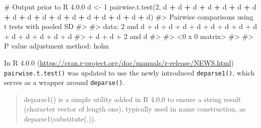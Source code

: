 \documentclass[
]{krantz}
\makeatletter
\newenvironment{Shaded}{\begin{snugshade}}{\end{snugshade}}
\newcommand{\CommentTok}[1]{\textcolor[rgb]{0.56,0.35,0.01}{\textit{#1}}}
\newcommand{\DecValTok}[1]{\textcolor[rgb]{0.00,0.00,0.81}{#1}}
\newcommand{\KeywordTok}[1]{\textcolor[rgb]{0.13,0.29,0.53}{\textbf{#1}}}
\newcommand{\NormalTok}[1]{#1}
\newcommand{\OperatorTok}[1]{\textcolor[rgb]{0.81,0.36,0.00}{\textbf{#1}}}
\newcommand{\StringTok}[1]{\textcolor[rgb]{0.31,0.60,0.02}{#1}}
\renewcommand{\href}[2]{#2 (\url{#1})}
\newenvironment{kframe}{%
\medskip{}
\setlength{\fboxsep}{.8em}
 \def\at@end@of@kframe{}%
 \ifinner\ifhmode%
  \def\at@end@of@kframe{\end{minipage}}%
  \begin{minipage}{\columnwidth}%
 \fi\fi%
 \def\FrameCommand##1{\hskip\@totalleftmargin \hskip-\fboxsep
 \colorbox{shadecolor}{##1}\hskip-\fboxsep
     \hskip-\linewidth \hskip-\@totalleftmargin \hskip\columnwidth}%
 \MakeFramed {\advance\hsize-\width
   \@totalleftmargin\z@ \linewidth\hsize
   \@setminipage}}%
 {\par\unskip\endMakeFramed%
 \at@end@of@kframe}
\renewenvironment{Shaded}{\begin{kframe}}{\end{kframe}}
\renewcommand{\KeywordTok} [1]{\textcolor[rgb]{0.00,0.44,0.13}{{#1}}}
\renewcommand{\DecValTok}  [1]{\textcolor[rgb]{0.25,0.63,0.44}{{#1}}}
\renewcommand{\StringTok}  [1]{\textcolor[rgb]{0.25,0.44,0.63}{{#1}}}
\renewcommand{\CommentTok} [1]{\textcolor[rgb]{0.38,0.63,0.69}{{#1}}}
\renewcommand{\NormalTok}  [1]{{#1}}
\makeatother
\begin{document}
\begin{Shaded}
\begin{Highlighting}[]
\CommentTok{# Output prior to R 4.0.0}
\NormalTok{d <-}\StringTok{ }\DecValTok{1}
\KeywordTok{pairwise.t.test}\NormalTok{(}\DecValTok{2}\NormalTok{, d }\OperatorTok{+}\StringTok{ }\NormalTok{d }\OperatorTok{+}\StringTok{ }\NormalTok{d }\OperatorTok{+}\StringTok{ }\NormalTok{d }\OperatorTok{+}\StringTok{ }\NormalTok{d }\OperatorTok{+}\StringTok{ }\NormalTok{d }\OperatorTok{+}\StringTok{ }\NormalTok{d }\OperatorTok{+}\StringTok{ }\NormalTok{d }\OperatorTok{+}\StringTok{ }
\StringTok{                  }\NormalTok{d }\OperatorTok{+}\StringTok{ }\NormalTok{d }\OperatorTok{+}\StringTok{ }\NormalTok{d }\OperatorTok{+}\StringTok{ }\NormalTok{d }\OperatorTok{+}\StringTok{ }\NormalTok{d }\OperatorTok{+}\StringTok{ }\NormalTok{d }\OperatorTok{+}\StringTok{ }\NormalTok{d }\OperatorTok{+}\StringTok{ }\NormalTok{d }\OperatorTok{+}\StringTok{ }\NormalTok{d)}
\CommentTok{#>  Pairwise comparisons using t tests with pooled SD }
\CommentTok{#> }
\CommentTok{#> data:  2 and d + d + d + d + d + d + d + d + d + d + d + d + d + d}
\CommentTok{#> + d + d +  2 and     d }
\CommentTok{#> }
\CommentTok{#> <0 x 0 matrix>}
\CommentTok{#> }
\CommentTok{#> P value adjustment method: holm }
\end{Highlighting}
\end{Shaded}

In \href{https://cran.r-project.org/doc/manuals/r-release/NEWS.html}{R 4.0.0} \texttt{pairwise.t.test()} was updated to use the newly introduced \texttt{deparse1()}, which serves as a wrapper around \texttt{deparse()}.

\begin{quote}
deparse1() is a simple utility added in R 4.0.0 to ensure a string result (character vector of length one), typically used in name construction, as deparse1(substitute(.)).
\end{quote}
\end{document}
